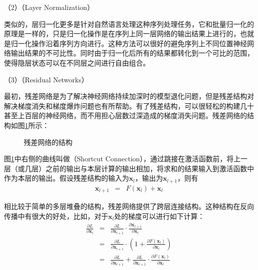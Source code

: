 \parinterval  （2）{\small{}}（Layer Normalization）

\parinterval  类似的，层归一化更多是针对自然语言处理这种序列处理任务\cite{Ba2016LayerN}，它和批量归一化的原理是一样的，只是归一化操作是在序列上同一层网络的输出结果上进行的，也就是归一化操作沿着序列方向进行。这种方法可以很好的避免序列上不同位置神经网络输出结果的不可比性。同时由于归一化后所有的结果都转化到一个可比的范围，使得隐层状态可以在不同层之间进行自由组合。

\parinterval  （3）{\small{}}（Residual Networks）

\parinterval  最初，残差网络是为了解决神经网络持续加深时的模型退化问题\cite{DBLP:journals/corr/HeZRS15}，但是残差结构对解决梯度消失和梯度爆炸问题也有所帮助。有了残差结构，可以很轻松的构建几十甚至上百层的神经网络，而不用担心层数过深造成的梯度消失问题。残差网络的结构如图\ref{fig:5-51}所示：

\begin{figure}[htp]
\centering

\caption{残差网络的结构}
\label{fig:5-51}
\end{figure}

\parinterval  图\ref{fig:5-51}中右侧的曲线叫做{\small{}}（Shortcut Connection），通过跳接在激活函数前，将上一层（或几层）之前的输出与本层计算的输出相加，将求和的结果输入到激活函数中作为本层的输出。假设残差结构的输入为$ \mathbf x_l $，输出为$ \mathbf x_{l+1} $，则有
\begin{eqnarray}
\mathbf x_{l+1}&=&F(\mathbf x_l)+\mathbf x_l
\label{eq:5-44}
\end{eqnarray}

\parinterval  相比较于简单的多层堆叠的结构，残差网络提供了跨层连接结构。这种结构在反向传播中有很大的好处，比如，对于$ \mathbf x_l $处的梯度可以进行如下计算：
\begin{eqnarray}
\frac{\partial L}{\partial \mathbf x_l}&=&\frac{\partial L}{\partial \mathbf x_{l+1}} \cdot  \frac{\partial \mathbf x_{l+1}}{\partial \mathbf x_l}\nonumber\\
&=&\frac{\partial L}{\partial \mathbf x_{l+1}} \cdot \left(1+\frac{\partial F(\mathbf x_l)}{\partial \mathbf x_l}\right)\nonumber\\
&=&\frac{\partial L}{\partial \mathbf x_{l+1}}+\frac{\partial L}{\partial \mathbf x_{l+1}} \cdot  \frac{\partial F(\mathbf x_l)}{\partial \mathbf x_l}
\label{eq:5-45}
\end{eqnarray}

